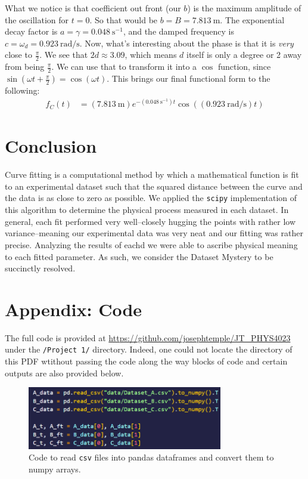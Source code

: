 \documentclass{article}
\begin{document}
What we notice is that coefficient out front (our $b$) is the maximum amplitude of the oscillation for $t=0$. 
So that would be $b = B = \qty{7.813}{\meter}$. The exponential decay factor is $a = \gamma =  
\qty{0.048}{\second^{-1}}$, 
and the damped frequency is $c = \omega_d = \qty{0.923}{\radian\per\second}$. Now, what's interesting about 
the phase is that it is \emph{very} close to $\frac{\pi}{2}$. We see that $2d \approx 3.09$, which 
means $d$ itself is only a degree or 2 away from being $\frac{\pi}{2}$. We can use that to transform it 
into a $\cos$ function, since $\sin(\omega t + \frac{\pi}{2}) = \cos(\omega t)$. This brings our final
functional form to the following:
\begin{align*}
    f_C(t) &= \left(\qty{7.813}{\meter}\right)e^{-\left(\qty{0.048}{\second^{-1}}\right)t}
    \cos\left(\left(\qty{0.923}{\radian\per\second}\right)t\right)
\end{align*}

\section{Conclusion}
Curve fitting is a computational method by which a mathematical function is fit to an experimental
dataset such that the squared distance between the curve and the data is as close to zero as possible.
We applied the \verb|scipy| implementation of this algorithm to determine the physical process
measured in each dataset. In general, each fit performed very well--closely hugging the points with
rather low variance--meaning our experimental data was very neat and our fitting was rather precise.
Analyzing the results of eachd we were able to ascribe physical meaning to each
fitted parameter. As such, we consider the Dataset Mystery to be succinctly resolved.

\section{Appendix: Code}
\label{sec:appendix}

The full code is provided at \url{https://github.com/josephtemple/JT_PHYS4023} under the \verb|/Project 1/|
directory. Indeed, one could not locate the directory of this PDF wtithout passing the code
along the way blocks of code and certain outputs are also provided below.

\begin{figure}[ht]
    \centering

    \includegraphics[width=0.76\textwidth]{../figures/read_code.png}

    \caption{Code to read \texttt{csv} files into pandas dataframes and convert them to numpy arrays.}

    \label{fig:read}
\end{figure}
\end{document}
